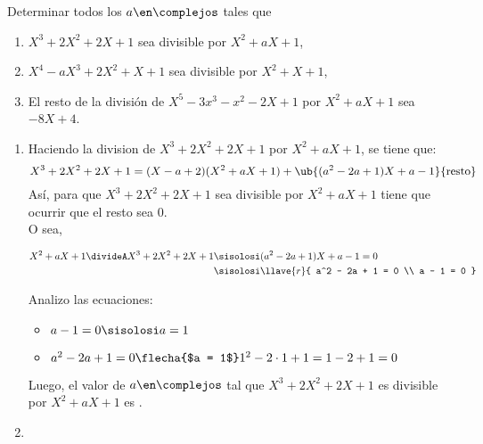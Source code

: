 \ejercicio
Determinar todos los $a \en \complejos$ tales que\\
\begin{enumerate}[label=\roman*)]
  \item $X^3 + 2X^2 + 2X + 1$ sea divisible por $X^2 + aX + 1$,
  \item $X^4 - aX^3 + 2X^2 + X + 1$ sea divisible por $X^2 + X + 1$,
  \item El resto de la división de $X^5 - 3x^3 - x^2 - 2X + 1$ por $X^2 + aX + 1$ sea $-8X + 4$.
\end{enumerate}

\separadorCorto

\begin{enumerate}[label=\roman*)]
  \item
        Haciendo la division de $X^3 + 2X^2 + 2X + 1$ por $X^2 + aX + 1$, se tiene que:
        \[
          X^3 + 2X^2 + 2X + 1 = (X - a + 2)(X^2 + aX + 1) + \ub{(a^2 - 2a + 1)X + a - 1}{\text{resto}}
        \]
        Así, para que $X^3 + 2X^2 + 2X + 1$ sea divisible por $X^2 + aX + 1$ tiene que ocurrir que el resto sea 0.\\
        O sea,

        \begin{align*}
          X^2 + aX + 1 \divideA X^3 + 2X^2 + 2X + 1 \sisolosi & (a^2 - 2a + 1)X + a - 1 = 0 \\
          \sisolosi                                           & \llave{r}{
          a^2 - 2a + 1 = 0                                                                  \\
            a - 1 = 0
          }
        \end{align*}

        Analizo las ecuaciones:\\
        \begin{itemize}
          \item $a - 1 = 0 \sisolosi a = 1$
          \item $a^2 - 2a + 1 = 0
                  \flecha{$a = 1$}
                  1^2 - 2 \cdot 1 + 1 = 1 - 2 + 1 = 0$
        \end{itemize}

        Luego, el valor de $a \en \complejos$
        tal que $X^3 + 2X^2 + 2X + 1$ es divisible por $X^2 + aX + 1$ es .

  \item \hacer


\end{enumerate}
